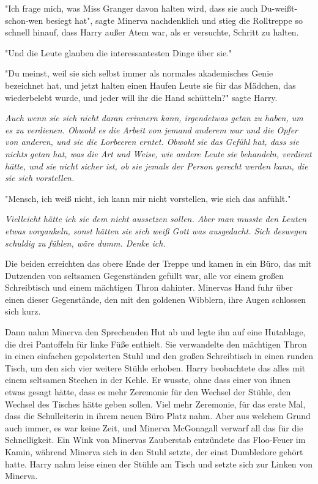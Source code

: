 {"Ich frage mich, was Miss Granger davon halten wird, dass sie auch Du-weißt-schon-wen besiegt hat", sagte Minerva nachdenklich und stieg die Rolltreppe so schnell hinauf, dass Harry außer Atem war, als er versuchte, Schritt zu halten.

"Und die Leute glauben die interessantesten Dinge über sie."

"Du meinst, weil sie sich selbst immer als normales akademisches Genie bezeichnet hat, und jetzt halten einen Haufen Leute sie für das Mädchen, das wiederbelebt wurde, und jeder will ihr die Hand schütteln?" sagte Harry.

\emph{Auch wenn sie sich nicht daran erinnern kann, irgendetwas getan zu haben, um es zu verdienen. Obwohl es die Arbeit von jemand anderem war und die Opfer von anderen, und sie die Lorbeeren erntet. Obwohl sie das Gefühl hat, dass sie nichts} \emph{getan hat, was die Art und Weise, wie andere Leute sie behandeln, verdient hätte, und sie nicht sicher ist, ob sie jemals der Person gerecht werden kann, die sie sich vorstellen.}

"Mensch, ich weiß nicht, ich kann mir nicht vorstellen, wie sich das anfühlt."

\emph{Vielleicht hätte ich sie dem nicht aussetzen sollen. Aber man musste den Leuten etwas vorgaukeln, sonst hätten sie sich weiß Gott was ausgedacht. Sich deswegen schuldig zu fühlen, wäre dumm. Denke ich.}

Die beiden erreichten das obere Ende der Treppe und kamen in ein Büro, das mit Dutzenden von seltsamen Gegenständen gefüllt war, alle vor einem großen Schreibtisch und einem mächtigen Thron dahinter. Minervas Hand fuhr über einen dieser Gegenstände, den mit den goldenen Wibblern, ihre Augen schlossen sich kurz.

Dann nahm Minerva den Sprechenden Hut ab und legte ihn auf eine Hutablage, die drei Pantoffeln für linke Füße enthielt. Sie verwandelte den mächtigen Thron in einen einfachen gepolsterten Stuhl und den großen Schreibtisch in einen runden Tisch, um den sich vier weitere Stühle erhoben. Harry beobachtete das alles mit einem seltsamen Stechen in der Kehle. Er wusste, ohne dass einer von ihnen etwas gesagt hätte, dass es mehr Zeremonie für den Wechsel der Stühle, den Wechsel des Tisches hätte geben sollen. Viel mehr Zeremonie, für das erste Mal, dass die Schulleiterin in ihrem neuen Büro Platz nahm. Aber aus welchem Grund auch immer, es war keine Zeit, und Minerva McGonagall verwarf all das für die Schnelligkeit. Ein Wink von Minervas Zauberstab entzündete das Floo-Feuer im Kamin, während Minerva sich in den Stuhl setzte, der einst Dumbledore gehört hatte. Harry nahm leise einen der Stühle am Tisch und setzte sich zur Linken von Minerva.

}
